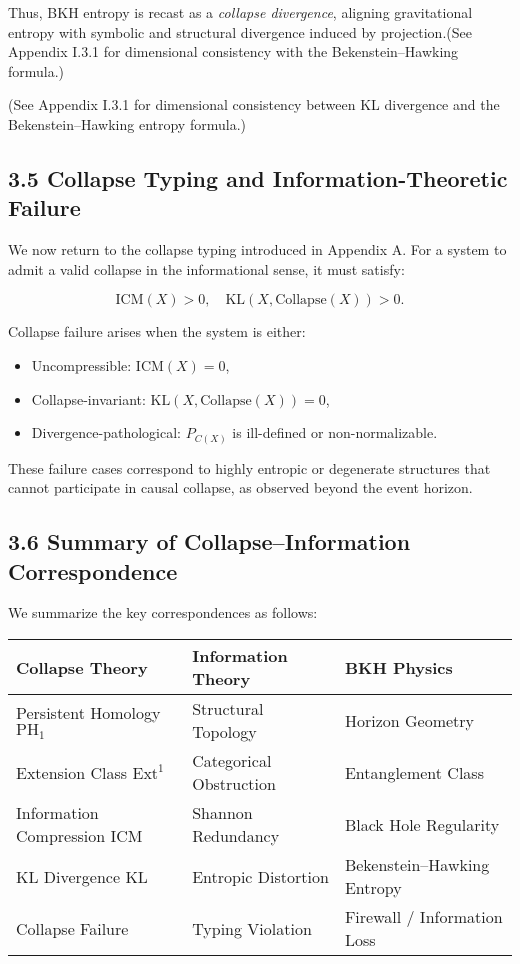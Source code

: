 \documentclass[11pt]{article}
\begin{document}
Thus, BKH entropy is recast as a \emph{collapse divergence}, aligning gravitational entropy with symbolic and structural divergence induced by projection.(See Appendix I.3.1 for dimensional consistency with the Bekenstein–Hawking formula.)

(See Appendix I.3.1 for dimensional consistency between KL divergence and the Bekenstein–Hawking entropy formula.)


\subsection*{3.5 Collapse Typing and Information-Theoretic Failure}

We now return to the collapse typing introduced in Appendix A. For a system to admit a valid collapse in the informational sense, it must satisfy:

\[
\mathrm{ICM}(X) > 0, \quad \mathrm{KL}(X, \mathrm{Collapse}(X)) > 0.
\]

Collapse failure arises when the system is either:

\begin{itemize}
    \item Uncompressible: \( \mathrm{ICM}(X) = 0 \),
    \item Collapse-invariant: \( \mathrm{KL}(X, \mathrm{Collapse}(X)) = 0 \),
    \item Divergence-pathological: \( P_{C(X)} \) is ill-defined or non-normalizable.
\end{itemize}

These failure cases correspond to highly entropic or degenerate structures that cannot participate in causal collapse, as observed beyond the event horizon.

\subsection*{3.6 Summary of Collapse–Information Correspondence}

We summarize the key correspondences as follows:

\begin{center}
\begin{tabular}{lll}
\toprule
\textbf{Collapse Theory} & \textbf{Information Theory} & \textbf{BKH Physics} \\
\midrule
Persistent Homology \( \mathrm{PH}_1 \) & Structural Topology & Horizon Geometry \\
Extension Class \( \mathrm{Ext}^1 \) & Categorical Obstruction & Entanglement Class \\
Information Compression \( \mathrm{ICM} \) & Shannon Redundancy & Black Hole Regularity \\
KL Divergence \( \mathrm{KL} \) & Entropic Distortion & Bekenstein–Hawking Entropy \\
Collapse Failure & Typing Violation & Firewall / Information Loss \\
\bottomrule
\end{tabular}
\end{center}
\end{document}
